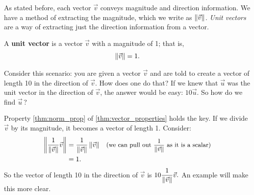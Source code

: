 As stated before, each vector $\vec v$ conveys magnitude and direction information. We have a method of extracting the magnitude, which we write as $\left\lVert \vec v \right\rVert$. \emph{Unit vectors} are a way of extracting just the direction information from a vector.

\begin{definition}\label{def:unit_vector}%
A \textbf{unit vector} is a vector $\vec v$ with a magnitude of 1; that is, 
\[\left\lVert \vec v \right\rVert=1.\]
\end{definition}

Consider this scenario: you are given a vector $\vec v$ and are told to create a vector of length 10 in the direction of $\vec v$. How does one do that? If we knew that $\vec u$ was the unit vector in the direction of $\vec v$, the answer would be easy: $10\vec u$. So how do we find $\vec u$\,?


Property \ref{thm:norm_prop} of \autoref{thm:vector_properties} holds the key. If we divide $\vec v$ by its magnitude, it becomes a vector of length 1. Consider:
\begin{align*}
	\left\lVert \frac{1}{\left\lVert \vec v \right\rVert}\vec v \right\rVert
	&= \frac{1}{\left\lVert \vec v \right\rVert}\left\lVert \vec v \right\rVert
	& \text{\small (we can pull out $\displaystyle \frac{1}{\left\lVert \vec v \right\rVert}$ as it is a scalar)}\\
	&= 1.
\end{align*}			
So the vector of length 10 in the direction of $\vec v$ is $\displaystyle 10\frac{1}{\left\lVert \vec v \right\rVert}\vec v.$ An example will make this more clear.


